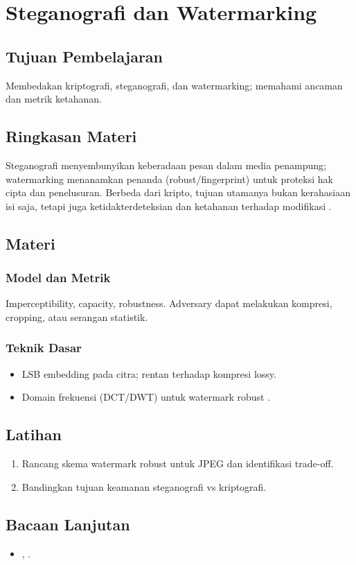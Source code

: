 \documentclass[../main.tex]{subfiles}
\begin{document}
\chapter{Steganografi dan Watermarking}
\section{Tujuan Pembelajaran}
Membedakan kriptografi, steganografi, dan watermarking; memahami ancaman dan metrik ketahanan.

\section{Ringkasan Materi}
Steganografi menyembunyikan keberadaan pesan dalam media penampung; watermarking menanamkan penanda (robust/fingerprint) untuk proteksi hak cipta dan penelusuran. Berbeda dari kripto, tujuan utamanya bukan kerahasiaan isi saja, tetapi juga ketidakterdeteksian dan ketahanan terhadap modifikasi \citep{cox2007digitalstego,wikipedia_steganography}.

\section{Materi}
\subsection{Model dan Metrik}
Imperceptibility, capacity, robustness. Adversary dapat melakukan kompresi, cropping, atau serangan statistik.

\subsection{Teknik Dasar}
\begin{itemize}
  \item LSB embedding pada citra; rentan terhadap kompresi lossy.
  \item Domain frekuensi (DCT/DWT) untuk watermark robust \citep{cox2007digitalstego}.
\end{itemize}

\section{Latihan}
\begin{enumerate}
  \item Rancang skema watermark robust untuk JPEG dan identifikasi trade-off.
  \item Bandingkan tujuan keamanan steganografi vs kriptografi.
\end{enumerate}

\section{Bacaan Lanjutan}
\begin{itemize}
  \item \citep{cox2007digitalstego}, \citep{wikipedia_steganography}.
\end{itemize}
\end{document}
